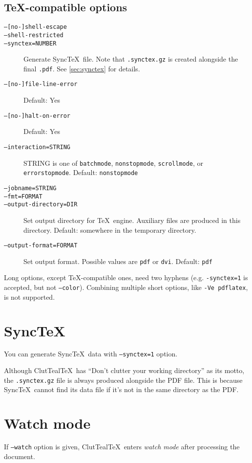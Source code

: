 \documentclass[a4paper]{report}
\newcommand\CluttealTeX{ClutTeal\TeX\xspace}
\newcommand\metavar[1]{\textnormal{\textsf{#1}}}
\begin{document}
\subsection{\TeX-compatible options}
\begin{description}
\item[\texttt{--[no-]shell-escape}]
\item[\texttt{--shell-restricted}]
\item[\texttt{--synctex=\metavar{NUMBER}}]
  Generate Sync\TeX\ file.
  Note that \texttt{.synctex.gz} is created alongside the final \texttt{.pdf}.
  See \autoref{sec:synctex} for details.
\item[\texttt{--[no-]file-line-error}]
  Default: Yes
\item[\texttt{--[no-]halt-on-error}]
  Default: Yes
\item[\texttt{--interaction=\metavar{STRING}}]
  \metavar{STRING} is one of \texttt{batchmode}, \texttt{nonstopmode}, \texttt{scrollmode}, or \texttt{errorstopmode}.
  Default: \texttt{nonstopmode}
\item[\texttt{--jobname=\metavar{STRING}}]
\item[\texttt{--fmt=\metavar{FORMAT}}]
\item[\texttt{--output-directory=\metavar{DIR}}]
  Set output directory for \TeX\ engine.
  Auxiliary files are produced in this directory.
  Default: somewhere in the temporary directory.
\item[\texttt{--output-format=\metavar{FORMAT}}]
  Set output format.
  Possible values are \texttt{pdf} or \texttt{dvi}.
  Default: \texttt{pdf}
\end{description}

Long options, except \TeX-compatible ones, need two hyphens (e.g. \texttt{-synctex=1} is accepted, but not \texttt{--color}).
Combining multiple short options, like \texttt{-Ve pdflatex}, is not supported.

\section{Sync\TeX}\label{sec:synctex}
You can generate Sync\TeX\ data with \texttt{--synctex=1} option.

Although \CluttealTeX\ has \enquote{Don't clutter your working directory} as its motto, the \texttt{.synctex.gz} file is always produced alongside the PDF file.
This is because Sync\TeX\ cannot find its data file if it's not in the same directory as the PDF.

\section{Watch mode}\label{sec:watch-mode}
If \texttt{--watch} option is given, \CluttealTeX\ enters \emph{watch mode} after processing the document.
\end{document}
